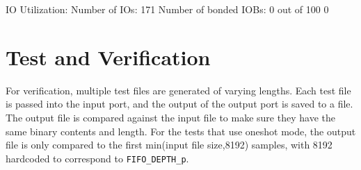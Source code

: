 \documentclass{article}
\edef\ecomp{fifo}
\begin{document}
IO Utilization: 
 Number of IOs:                         171
 Number of bonded IOBs:                   0  out of    100     0%
\fi

\iffalse
Timing Summary:
---------------
Speed Grade: -3

   Minimum period: 3.253ns (Maximum Frequency: 307.390MHz)
   Minimum input arrival time before clock: 2.359ns
   Maximum output required time after clock: 2.274ns
   Maximum combinational path delay: 1.609ns
\fi



\section*{Test and Verification}
\begin{flushleft}
For verification, multiple test files are generated of varying lengths. Each test file is passed into the input port, and the output of the output port is saved to a file. The output file is compared against the input file to make sure they have the same binary contents and length. For the tests that use oneshot mode, the output file is only compared to the first min(input file size,8192) samples, with 8192 hardcoded to correspond to \verb+FIFO_DEPTH_p+.
\end{flushleft}
\end{document}

